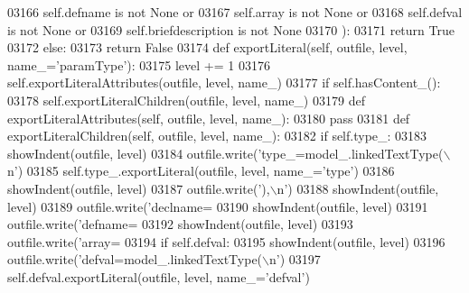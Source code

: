 \begin{DoxyCode}
{{{{{{{{{{{{{{{{{{{{{{{{{{{{{{{{{{{{{{{{{{{{{{{{{{{{{{{{{{{{{{{{{{{{{{{{{{{{{{{{{{{{{{{{{{{{{{{{{{{{{{{{{{{{{{{{{{{{{{{{{{{{{{{{{{{{{{{{{{{{{{{{{{{{{{{{{{{{{{{{{{{{{{{{{{{{{{{{{{{{{{{{{{{{{{{{{{{{{{{{{{{{{{{{{{03166             self.defname \textcolor{keywordflow}{is} \textcolor{keywordflow}{not} \textcolor{keywordtype}{None} \textcolor{keywordflow}{or}
03167             self.array \textcolor{keywordflow}{is} \textcolor{keywordflow}{not} \textcolor{keywordtype}{None} \textcolor{keywordflow}{or}
03168             self.defval \textcolor{keywordflow}{is} \textcolor{keywordflow}{not} \textcolor{keywordtype}{None} \textcolor{keywordflow}{or}
03169             self.briefdescription \textcolor{keywordflow}{is} \textcolor{keywordflow}{not} \textcolor{keywordtype}{None}
03170             ):
03171             \textcolor{keywordflow}{return} \textcolor{keyword}{True}
03172         \textcolor{keywordflow}{else}:
03173             \textcolor{keywordflow}{return} \textcolor{keyword}{False}
03174     \textcolor{keyword}{def }exportLiteral(self, outfile, level, name\_='paramType'):
03175         level += 1
03176         self.exportLiteralAttributes(outfile, level, name\_)
03177         \textcolor{keywordflow}{if} self.hasContent_():
03178             self.exportLiteralChildren(outfile, level, name\_)
03179     \textcolor{keyword}{def }exportLiteralAttributes(self, outfile, level, name\_):
03180         \textcolor{keywordflow}{pass}
03181     \textcolor{keyword}{def }exportLiteralChildren(self, outfile, level, name\_):
03182         \textcolor{keywordflow}{if} self.type\_:
03183             showIndent(outfile, level)
03184             outfile.write(\textcolor{stringliteral}{'type\_=model\_.linkedTextType(\(\backslash\)n'})
03185             self.type\_.exportLiteral(outfile, level, name\_=\textcolor{stringliteral}{'type'})
03186             showIndent(outfile, level)
03187             outfile.write(\textcolor{stringliteral}{'),\(\backslash\)n'})
03188         showIndent(outfile, level)
03189         outfile.write(\textcolor{stringliteral}{'declname=%
03190         showIndent(outfile, level)
03191         outfile.write(\textcolor{stringliteral}{'defname=%
03192         showIndent(outfile, level)
03193         outfile.write(\textcolor{stringliteral}{'array=%
03194         \textcolor{keywordflow}{if} self.defval:
03195             showIndent(outfile, level)
03196             outfile.write(\textcolor{stringliteral}{'defval=model\_.linkedTextType(\(\backslash\)n'})
03197             self.defval.exportLiteral(outfile, level, name\_=\textcolor{stringliteral}{'defval'})
}}}}}}}}}}}}}}}}}}}}}}}}}}}}}}}}}}}}}}}}}}}}}}}}}}}}}}}}}}}}}}}}}}}}}}}}}}}}}}}}}}}}}}}}}}}}}}}}}}}}}}}}}}}}}}}}}}}}}}}}}}}}}}}}}}}}}}}}}}}}}}}}}}}}}}}}}}}}}}}}}}}}}}}}}}}}}}}}}}}}}}}}}}}}}}}}}}}}}}}}}}}}}}}}}}}}}
\end{DoxyCode}

